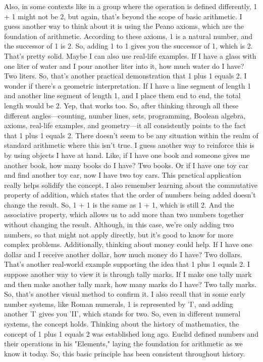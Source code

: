 {Also, in some contexts like in a group where the operation is defined differently, 1 + 1 might not be 2, but again, that's beyond the scope of basic arithmetic. 
I guess another way to think about it is using the Peano axioms, which are the foundation of arithmetic. According to these axioms, 1 is a natural number, and the successor of 1 is 2. So, adding 1 to 1 gives you the successor of 1, which is 2. That's pretty solid.
Maybe I can also use real-life examples. If I have a glass with one liter of water and I pour another liter into it, how much water do I have? Two liters. So, that's another practical demonstration that 1 plus 1 equals 2.
I wonder if there's a geometric interpretation. If I have a line segment of length 1 and another line segment of length 1, and I place them end to end, the total length would be 2. Yep, that works too.
So, after thinking through all these different angles—counting, number lines, sets, programming, Boolean algebra, axioms, real-life examples, and geometry—it all consistently points to the fact that 1 plus 1 equals 2. There doesn't seem to be any situation within the realm of standard arithmetic where this isn't true. 
I guess another way to reinforce this is by using objects I have at hand. Like, if I have one book and someone gives me another book, how many books do I have? Two books. Or if I have one toy car and find another toy car, now I have two toy cars. This practical application really helps solidify the concept.
I also remember learning about the commutative property of addition, which states that the order of numbers being added doesn't change the result. So, 1 + 1 is the same as 1 + 1, which is still 2. And the associative property, which allows us to add more than two numbers together without changing the result. Although, in this case, we're only adding two numbers, so that might not apply directly, but it's good to know for more complex problems.
Additionally, thinking about money could help. If I have one dollar and I receive another dollar, how much money do I have? Two dollars. That's another real-world example supporting the idea that 1 plus 1 equals 2.
I suppose another way to view it is through tally marks. If I make one tally mark and then make another tally mark, how many marks do I have? Two tally marks. So, that's another visual method to confirm it.
I also recall that in some early number systems, like Roman numerals, 1 is represented by 'I', and adding another 'I' gives you 'II', which stands for two. So, even in different numeral systems, the concept holds.
Thinking about the history of mathematics, the concept of 1 plus 1 equals 2 was established long ago. Euclid defined numbers and their operations in his "Elements," laying the foundation for arithmetic as we know it today. So, this basic principle has been consistent throughout history.
}
